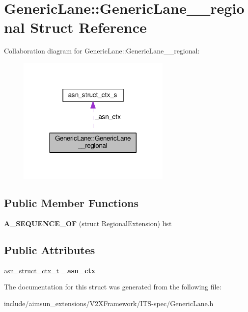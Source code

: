 \hypertarget{structGenericLane_1_1GenericLane____regional}{}\section{Generic\+Lane\+:\+:Generic\+Lane\+\_\+\+\_\+regional Struct Reference}
\label{structGenericLane_1_1GenericLane____regional}


Collaboration diagram for Generic\+Lane\+:\+:Generic\+Lane\+\_\+\+\_\+regional\+:\nopagebreak
\begin{figure}[H]
\begin{center}
\leavevmode
\includegraphics[width=212pt]{structGenericLane_1_1GenericLane____regional__coll__graph}
\end{center}
\end{figure}
\subsection*{Public Member Functions}
\begin{DoxyCompactItemize}
\item 
{\bfseries A\+\_\+\+S\+E\+Q\+U\+E\+N\+C\+E\+\_\+\+OF} (struct Regional\+Extension) list\hypertarget{structGenericLane_1_1GenericLane____regional_a5505b7bc61d1eb8601346cb2150cb3d0}{}\label{structGenericLane_1_1GenericLane____regional_a5505b7bc61d1eb8601346cb2150cb3d0}

\end{DoxyCompactItemize}
\subsection*{Public Attributes}
\begin{DoxyCompactItemize}
\item 
\hyperlink{structasn__struct__ctx__s}{asn\+\_\+struct\+\_\+ctx\+\_\+t} {\bfseries \+\_\+asn\+\_\+ctx}\hypertarget{structGenericLane_1_1GenericLane____regional_a081c9c169fba80f43446f375414ae3fb}{}\label{structGenericLane_1_1GenericLane____regional_a081c9c169fba80f43446f375414ae3fb}

\end{DoxyCompactItemize}


The documentation for this struct was generated from the following file\+:\begin{DoxyCompactItemize}
\item 
include/aimsun\+\_\+extensions/\+V2\+X\+Framework/\+I\+T\+S-\/spec/Generic\+Lane.\+h\end{DoxyCompactItemize}
